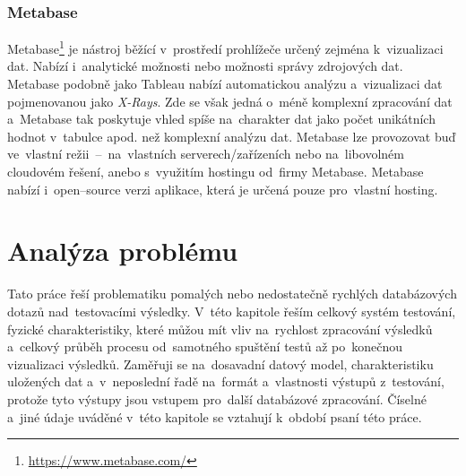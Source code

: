 \subsection{Metabase}
\label{subsection:Metabase}
Metabase\footnote{\href{https://www.metabase.com/}{https://www.metabase.com/}} je nástroj běžící v~prostředí
prohlížeče určený zejména k~vizualizaci dat. Nabízí i~analytické možnosti nebo možnosti správy zdrojových dat.
Metabase podobně jako Tableau nabízí automatickou analýzu a~vizualizaci dat pojmenovanou jako \textit{X-Rays}. Zde
se však jedná o~méně komplexní zpracování dat a~Metabase tak poskytuje vhled spíše na~charakter dat jako počet
unikátních hodnot v~tabulce apod. než komplexní analýzu dat. Metabase lze provozovat buď ve~vlastní režii~--~na~vlastních serverech/zařízeních nebo na~libovolném cloudovém řešení, anebo s~využitím hostingu od~firmy Metabase. Metabase nabízí i~open--source verzi aplikace, která je určená pouze pro~vlastní hosting.


\chapter{Analýza problému}
\label{chapter:analyza_problemu}
Tato práce řeší problematiku pomalých nebo nedostatečně rychlých databázových dotazů nad~testovacími výsledky.
V~této kapitole řeším celkový systém testování, fyzické charakteristiky, které můžou mít vliv na~rychlost zpracování
výsledků a~celkový průběh procesu od~samotného spuštění testů až po~konečnou vizualizaci výsledků. Zaměřuji se
na~dosavadní datový model, charakteristiku uložených dat a~v~neposlední řadě na~formát a~vlastnosti výstupů
z~testování, protože tyto výstupy jsou vstupem pro~další databázové zpracování.
Číselné a~jiné údaje uváděné v~této kapitole se vztahují k~období psaní této práce.


